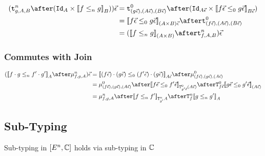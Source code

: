 \documentclass{report}
\newcommand{\Tz}[2]{\texttt{T}^0_{#1}#2}
\newcommand{\Tn}[2]{\texttt{T}^n_{#1}#2}
\newcommand{\bindz}[3]{\bind{#1}{#2}{#3}^0}
\newcommand{\bindn}[3]{\bind{#1}{#2}{#3}^n}
\newcommand\tstrengthz[3]{\tstrength{#1}{#2}{#3}^0}
\newcommand\tstrengthn[3]{\tstrength{#1}{#2}{#3}^n}
\newcommand\ev[0]{\vec{\e}}
\newcommand\subeffectz[0]{\subeffect_0}
\newcommand\subeffectn[0]{\subeffect_n}
\newcommand\dsen[2]{\db{#1 \subeffectn #2}}
\newcommand\dsez[2]{\db{#1 \subeffectz #2}}
\begin{document}

\begin{align}
    (\tstrengthn{g}{A}{B}\after(\Id{A}\times \db{f\subeffectn g}_B))\ev & = \tstrengthz{(g\ev)}{(A\ev)}{(B\ev)}\after(\Id{A\ev}\times \db{f\ev \subeffectz g\ev}_{B\ev})\\
    & = \db{f\ev \subeffectz g\ev}_{(A\times B)\ev} \after\tstrengthz{(f\ev)}{(A\ev)}{(B\ev)}\\
    & = (\db{f \subeffectn g}_{(A\times B)} \after\tstrengthn{f}{A}{B})\ev\\
\end{align}

\subsubsection{Commutes with Join}


\begin{align}
    (\dsen{f\dot g}{f'\dot g'}_A\after\bindn{f}{g}{A})\ev & = \dsez{(f\ev)\dot(g\ev)}{(f'\ev)\dot (g\ev)}_{A\ev}\after\bindz{(f\ev)}{(g\ev)}{(A\ev)}\\
    & = \bindz{(f\ev)}{(g\ev)}{(A\ev)}\after\dsez{f\ev}{f'\ev}_{\Tz{g'\ev}{(A\ev)}}\after \Tz{f\ev}{\dsez{g\ev}{g'\ev}}_{(A\ev)}\\
    &= \bindn{f}{g}{A}\after\dsen{f}{f'}_{\Tn{g'}{A}}\after\Tn{f}{\dsen{g}{g'}}_A
\end{align}

\subsection{Sub-Typing}
Sub-typing in $[E^n, \mathbb{C}]$ holds via sub-typing in $\mathbb{C}$
\end{document}
